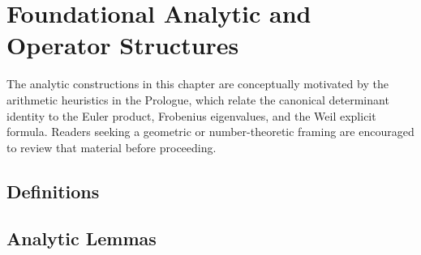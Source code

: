 \section{Foundational Analytic and Operator Structures}
\label{sec:foundations}

\begin{remark}
The analytic constructions in this chapter are conceptually motivated by the arithmetic heuristics in the Prologue,
which relate the canonical determinant identity to the Euler product, Frobenius eigenvalues, and the Weil explicit formula.
Readers seeking a geometric or number-theoretic framing are encouraged to review that material before proceeding.
\end{remark}



\subsection{Definitions}








\subsection{Analytic Lemmas}








